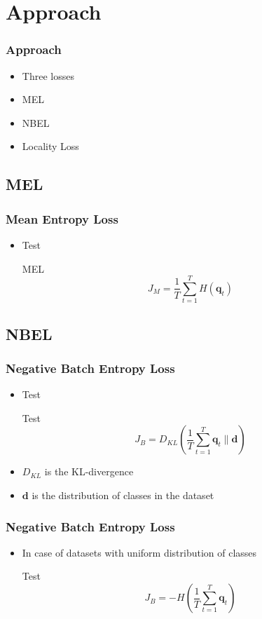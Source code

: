 \section{Approach}
\begin{frame}
	\frametitle{Approach}
	\begin{itemize}
		\item Three losses
		\item MEL
		\item NBEL
		\item Locality Loss
	\end{itemize}
\end{frame}


\subsection{MEL}
\begin{frame}
	\frametitle{Mean Entropy Loss}
	\begin{itemize}
		\item Test
	\begin{block}{MEL}
		\begin{equation*}
			J_M = \frac{1}{T}\sum_{t=1}^{T}H(\mathbf{q}_t)
		\end{equation*}
	\end{block}
	\end{itemize}
\end{frame}


\subsection{NBEL}
\begin{frame}
	\frametitle{Negative Batch Entropy Loss}
	\begin{itemize}
		\item Test
			\begin{block}{Test}
				\begin{equation*}
					\label{eq:nbel}
					J_B = D_{KL} (\frac{1}{T}\sum_{t=1}^{T}\mathbf{q}_t \lVert \mathbf{d})
				\end{equation*}
			\end{block}
		\item $D_{KL}$ is the KL-divergence
		\item $\mathbf{d}$ is the distribution of classes in the dataset
	\end{itemize}
\end{frame}

\begin{frame}
	\frametitle{Negative Batch Entropy Loss}
	\begin{itemize}
		\item In case of datasets with uniform distribution of classes
			\begin{block}{Test}
				\begin{equation*}
					J_B = -H(\frac{1}{T}\sum_{t=1}^{T}\mathbf{q}_t)
				\end{equation*}
			\end{block}
	\end{itemize}

\end{frame}


